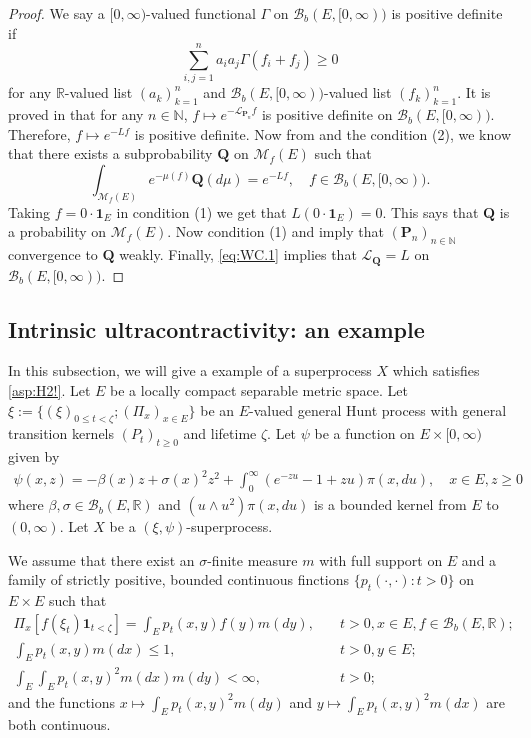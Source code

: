 \documentclass[12pt,a4paper]{amsart}
\numberwithin{equation}{section}
\theoremstyle{plain}
\theoremstyle{definition}
\theoremstyle{remark}
\begin{document}
\begin{proof}
	We say a $[0,\infty)$-valued functional $\Gamma$ on $\mathcal B_b(E,[0,\infty))$ is positive definite if
\[
\sum_{i,j =1}^n a_i a_j \Gamma (f_i + f_j)\geq 0
\]
for any $\mathbb R$-valued list $(a_k)_{k = 1}^n$ and $\mathcal B_b(E,[0,\infty))$-valued list $(f_k)_{k = 1}^n$.
	It is proved in \cite[Theorem 3.3.3]{Dawson1992Infinitely} that for any $n \in \mathbb N$, $f\mapsto e^{- \mathscr L_{\mathbf P_n}f}$ is positive definite on $\mathcal B_b(E,[0,\infty))$.
	Therefore, $f \mapsto e^{- L f}$ is positive definite.
	Now from \cite[Corollary (A.6)]{Fitzsimmons1989Construction} and the condition (2), we know that there exists a subprobability $\mathbf Q$ on $\mathcal M_f(E)$ such that
\begin{equation}	\label{eq:WC.1}
	\int_{\mathcal M_f(E)}e^{-\mu(f) } \mathbf Q(d\mu) = e^{-Lf}, \quad f \in \mathcal B_b(E,[0,\infty)).
\end{equation}
	Taking $f = 0 \cdot \mathbf 1_E$ in condition (1) we get that $L(0\cdot \mathbf 1_E) = 0$.
	This says that $\mathbf Q$ is a probability on $\mathcal M_f(E)$.
	Now condition (1) and \cite[Theorem 1.8]{Li2011MeasureValued} imply that $(\mathbf P_n)_{n \in \mathbb N}$ convergence to $\mathbf Q$ weakly.
	Finally, \eqref{eq:WC.1} implies that $\mathscr L_{\mathbf Q} = L$ on $\mathcal B_b(E,[0,\infty))$.
\end{proof}

\subsection{Intrinsic ultracontractivity: an example} \label{sec:example}
	In this subsection, we will give a example of a superprocess $X$ which satisfies \eqref{asp:H2!}.
	Let $E$ be a locally compact separable metric space.
	Let $\xi:= \{(\xi)_{0\leq t < \zeta}; (\Pi_x)_{x\in E}\}$ be an $E$-valued general Hunt process with general transition kernels $(P_t)_{t\geq 0}$ and lifetime $\zeta$.
	Let $\psi$ be a function on $E \times [0,\infty)$ given by
\begin{align}
	\psi(x,z)
	=- \beta(x) z + \sigma(x)^2 z^2 + \int_0^\infty (e^{-zu} -1 + zu) \pi(x,du),
	\quad x\in E, z\geq 0
\end{align}
	where $\beta, \sigma \in \mathcal B_b(E,\mathbb R)$ and $(u \wedge u^2) \pi(x,du)$ is a bounded kernel from $E$ to $(0,\infty)$.
	Let $X$ be a $(\xi, \psi)$-superprocess.

	We assume  that there exist an $\sigma$-finite measure $m$ with full support on $E$ and a family of strictly positive, bounded continuous finctions $\{p_t(\cdot,\cdot): t>0\}$ on $E\times E$ such that
\begin{align}
	\Pi_x[f(\xi_t) \mathbf 1_{t< \zeta}] = \int_E p_t(x,y) f(y)m(dy), & \quad t>0, x\in E, f\in \mathcal B_b(E,\mathbb R);
	\\ \int_E p_t(x,y) m(dx) \leq 1, &\quad t>0, y\in E;
	\\ \int_E \int_E p_t(x,y)^2 m(dx)m(dy) < \infty, &\quad t>0;
\end{align}
	and the functions $x \mapsto \int_E p_t(x,y)^2m(dy)$ and $y\mapsto \int_E p_t(x,y)^2m(dx)$ are both continuous.
\end{document}
